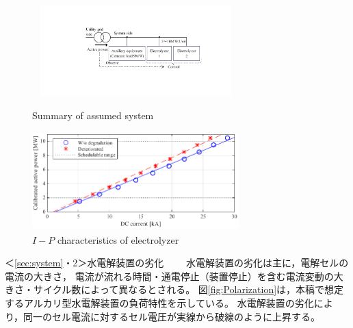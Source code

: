 \documentclass[fleqn]{ieej}
\begin{document}
\begin{figure}[b]%
      \begin{center}
      \setlength{\abovecaptionskip}{0mm} %
      \setlength{\belowcaptionskip}{0mm} %
      \includegraphics[width=8cm,height=3.5cm]{System_2units.pdf}  
      \caption{Summary of assumed system}\label{fig:System}
       
    \end{center}
    \begin{center}
      \setlength{\abovecaptionskip}{0mm} %
      \setlength{\belowcaptionskip}{0mm} %
      \includegraphics[width=8cm,height=3.8cm]{Current_power_curve.pdf}  
      \caption{$I-P$ characteristics of electrolyzer}\label{fig:power_curve}   
    \end{center}
\end{figure}

＜\ref{sec:system}・2＞水電解装置の劣化　　
水電解装置の劣化は主に，電解セルの電流の大きさ，
電流が流れる時間・通電停止（装置停止）を含む電流変動の大きさ・サイクル数によって異なるとされる。
図\ref{fig:Polarization}は，本稿で想定するアルカリ型水電解装置の負荷特性を示している。
水電解装置の劣化により，同一のセル電流に対するセル電圧が実線から破線のように上昇する。

\end{document}
